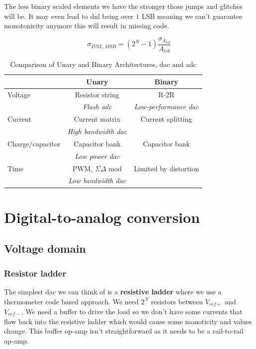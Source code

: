 \documentclass{report}
\begin{document}
The less binary scaled elements we have the stronger those jumps and glitches will be. It may even lead to \gls{dnl} being over $1$ LSB meaning we can't guarantee monotonicity anymore this will result in missing code.

\begin{equation}
    \sigma_{DNL, MSB} = (2^N -1) \frac{\sigma_{A_{lsb}}}{A_{lsb}}
\end{equation}

\begin{table}[H]
    \centering
    \renewcommand{\arraystretch}{1.3} %
    \begin{tabular}{|l|c|c|}
        \hline
        & \textbf{Unary} & \textbf{Binary} \\
        \hline
        Voltage & Resistor string & R-2R \\
        &  \textit{Flash \gls{adc}} & \textit{Low-performance \gls{dac}} \\
        \hline
        Current & Current matrix & Current splitting \\
        &  \textit{High bandwidth \gls{dac}} & \\
        \hline
        Charge/capacitor & Capacitor bank & Capacitor bank \\
        &  \textit{Low power \gls{dac}} & \\
        \hline
        Time & PWM, $\Sigma\Delta$ mod &  Limited by distortion \\
        &  \textit{Low bandwidth \gls{dac}} & \\
        \hline
    \end{tabular}
    \caption{Comparison of Unary and Binary Architectures, \gls{dac} and \gls{adc}}
    \label{tab:unary_binary_comparison}
\end{table}

\section{Digital-to-analog conversion}

\subsection{Voltage domain}

\subsubsection{Resistor ladder}

The simplest \gls{dac} we can think of is a \textbf{resistive ladder} where we use a thermometer code based approach. We need $2^N$ resistors between $V_{ref+}$ and $V_{ref-}$. We need a buffer to drive the load so we don't have some currents that flow back into the resistive ladder which would cause some monoticity and values change. This buffer op-amp isn't straightforward as it needs to be a rail-to-rail op-amp.\\
\end{document}
